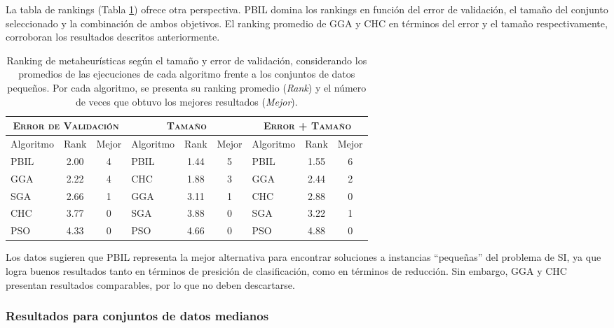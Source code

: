 La tabla de rankings (Tabla \ref{res-small-rank}) ofrece otra perspectiva. PBIL domina los rankings en función del error de validación, el tamaño del conjunto seleccionado y la combinación de ambos objetivos. El ranking promedio de GGA y CHC en términos del error y el tamaño respectivamente, corroboran los resultados descritos anteriormente.

\begin{table}[h!]
\centering
\begin{tabular}{l c c|l c c|l c c}
\hline
\multicolumn{3}{c|}{\textsc{Error de Validación}}
	& \multicolumn{3}{c|}{\textsc{Tamaño}}
	& \multicolumn{3}{c}{\textsc{Error + Tamaño}} \\
\hline
Algoritmo & Rank & Mejor & Algoritmo & Rank & Mejor & Algoritmo & Rank & Mejor \\
\hline
\hline
PBIL & 2.00 & 4 & PBIL & 1.44 & 5 & PBIL & 1.55 & 6 \\
GGA  & 2.22 & 4 & CHC  & 1.88 & 3 & GGA  & 2.44 & 2 \\
SGA  & 2.66 & 1 & GGA  & 3.11 & 1 & CHC  & 2.88 & 0 \\
CHC  & 3.77 & 0 & SGA  & 3.88 & 0 & SGA  & 3.22 & 1 \\
PSO  & 4.33 & 0 & PSO  & 4.66 & 0 & PSO  & 4.88 & 0 \\
\hline
\end{tabular}
\caption[Ranking de metaheurísticas según el tamaño y error de validación en conjuntos de datos pequeños]{Ranking de metaheurísticas según el tamaño y error de validación, considerando los promedios de las ejecuciones de cada algoritmo frente a los conjuntos de datos pequeños. Por cada algoritmo, se presenta su ranking promedio (\emph{Rank}) y el número de veces que obtuvo los mejores resultados (\emph{Mejor}).}
\label{res-small-rank}
\end{table}

Los datos sugieren que PBIL representa la mejor alternativa para encontrar soluciones a instancias ``pequeñas'' del problema de SI, ya que logra buenos resultados tanto en términos de presición de clasificación, como en términos de reducción. Sin embargo, GGA y CHC presentan resultados comparables, por lo que no deben descartarse.

\subsubsection{Resultados para conjuntos de datos medianos}

